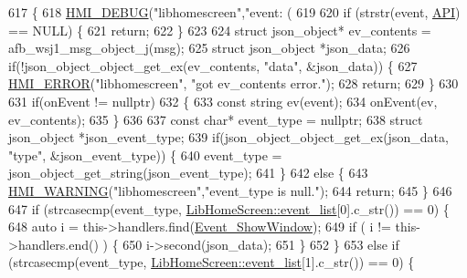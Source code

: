 \begin{DoxyCode}
617 \{
618     \hyperlink{include_2hmi-debug_8h_a0d26d8b8201011dade787236519711c0}{HMI\_DEBUG}(\textcolor{stringliteral}{"libhomescreen"},\textcolor{stringliteral}{"event: (%
619 
620     \textcolor{keywordflow}{if} (strstr(event, \hyperlink{libhomescreen_8cpp_a1e2d6e77dd8f0162f830058579eab42f}{API}) == NULL) \{
621         \textcolor{keywordflow}{return};
622     \}
623 
624     \textcolor{keyword}{struct }json\_object* ev\_contents = afb\_wsj1\_msg\_object\_j(msg);
625     \textcolor{keyword}{struct }json\_object *json\_data;
626     \textcolor{keywordflow}{if}(!json\_object\_object\_get\_ex(ev\_contents, \textcolor{stringliteral}{"data"}, &json\_data)) \{
627         \hyperlink{include_2hmi-debug_8h_a65bb6c7cfe38f8a724beab5059d36fb2}{HMI\_ERROR}(\textcolor{stringliteral}{"libhomescreen"}, \textcolor{stringliteral}{"got ev\_contents error."});
628         \textcolor{keywordflow}{return};
629     \}
630 
631     \textcolor{keywordflow}{if}(onEvent != \textcolor{keyword}{nullptr})
632     \{
633         \textcolor{keyword}{const} \textcolor{keywordtype}{string} ev(event);
634         onEvent(ev, ev\_contents);
635     \}
636 
637     \textcolor{keyword}{const} \textcolor{keywordtype}{char}* event\_type = \textcolor{keyword}{nullptr};
638     \textcolor{keyword}{struct }json\_object *json\_event\_type;
639     \textcolor{keywordflow}{if}(json\_object\_object\_get\_ex(json\_data, \textcolor{stringliteral}{"type"}, &json\_event\_type)) \{
640         event\_type = json\_object\_get\_string(json\_event\_type);
641     \}
642     \textcolor{keywordflow}{else} \{
643         \hyperlink{include_2hmi-debug_8h_a25361812432cd2480bc8f1a8e56ecbf7}{HMI\_WARNING}(\textcolor{stringliteral}{"libhomescreen"},\textcolor{stringliteral}{"event\_type is null."});
644         \textcolor{keywordflow}{return};
645     \}
646 
647     \textcolor{keywordflow}{if} (strcasecmp(event\_type, \hyperlink{class_lib_home_screen_a6a6d8a4d33a006a08652e7377a4c29e9}{LibHomeScreen::event\_list}[0].c\_str()) == 0) \{
648         \textcolor{keyword}{auto} i = this->handlers.find(\hyperlink{class_lib_home_screen_a82616c91ac211d2ad08e709b524bf154a3fb3563c64786f1a2ae404df6edffd5c}{Event\_ShowWindow});
649         \textcolor{keywordflow}{if} ( i != this->handlers.end() ) \{
650             i->second(json\_data);
651         \}
652     \}
653     \textcolor{keywordflow}{else} \textcolor{keywordflow}{if} (strcasecmp(event\_type, \hyperlink{class_lib_home_screen_a6a6d8a4d33a006a08652e7377a4c29e9}{LibHomeScreen::event\_list}[1].c\_str()) == 0) \{
}
\end{DoxyCode}
